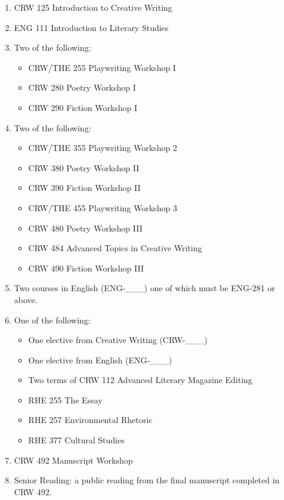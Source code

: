 \documentclass[
  letterpaper,
]{scrbook}
\providecommand{\tightlist}{%
  \setlength{\itemsep}{0pt}\setlength{\parskip}{0pt}}
\begin{document}
\begin{enumerate}
\def\labelenumi{\arabic{enumi}.}
\tightlist
\item
  CRW 125 Introduction to Creative Writing
\item
  ENG 111 Introduction to Literary Studies
\item
  Two of the following:

  \begin{itemize}
  \tightlist
  \item
    CRW/THE 255 Playwriting Workshop I
  \item
    CRW 280 Poetry Workshop I
  \item
    CRW 290 Fiction Workshop I
  \end{itemize}
\item
  Two of the following:

  \begin{itemize}
  \tightlist
  \item
    CRW/THE 355 Playwriting Workshop 2
  \item
    CRW 380 Poetry Workshop II
  \item
    CRW 390 Fiction Workshop II
  \item
    CRW/THE 455 Playwriting Workshop 3
  \item
    CRW 480 Poetry Workshop III
  \item
    CRW 484 Advanced Topics in Creative Writing
  \item
    CRW 490 Fiction Workshop III
  \end{itemize}
\item
  Two courses in English (ENG-\_\_\_) one of which must be ENG-281 or
  above.
\item
  One of the following:

  \begin{itemize}
  \tightlist
  \item
    One elective from Creative Writing (CRW-\_\_\_)
  \item
    One elective from English (ENG-\_\_\_)
  \item
    Two terms of CRW 112 Advanced Literary Magazine Editing
  \item
    RHE 255 The Essay
  \item
    RHE 257 Environmental Rhetoric
  \item
    RHE 377 Cultural Studies
  \end{itemize}
\item
  CRW 492 Manuscript Workshop
\item
  Senior Reading: a public reading from the final manuscript completed
  in CRW 492.
\end{enumerate}
\end{document}
